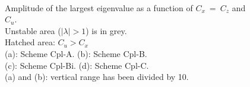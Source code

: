 \documentclass[a4paper]{article}
\numberwithin{equation}{section}
\begin{document}
\begin{figure}[!ht]
   \centering
   \quad
   \\
   \quad
   \caption{Amplitude of the largest eigenvalue as a function of $C_x\ =\ C_z$ and $C_u$.\\
       Unstable area ($\mid\lambda\mid >1$) is in grey.\\
       Hatched area: $C_u > C_x$ \\
       (a): Scheme Cpl-A. (b): Scheme Cpl-B.\\
       (c): Scheme Cpl-Bi. (d): Scheme Cpl-C.\\
       (a) and (b): vertical range has been divided by 10.}
   \label{Figstabadvsch}
\end{figure}
\end{document}
